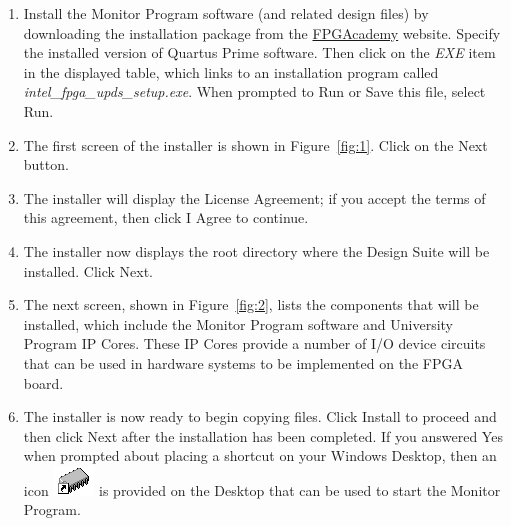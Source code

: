 \documentclass[11pt, twoside, pdftex]{article}
\begin{document}
\begin{enumerate}

\item Install the Monitor Program software (and related design files) by downloading the 
installation package from the 
\href{https://www.fpgacademy.org/tools.html}{FPGAcademy} website.
Specify the installed version of Quartus Prime software.
Then click on the {\it EXE} item in the displayed table, 
which links to an installation program called 
{\it intel\_fpga\_upds\_setup.exe}. When prompted to 
{\sf Run} or {\sf Save} this file, select {\sf Run}.
		  
\item The first screen of the installer is shown in Figure~\ref{fig:1}.
Click on the {\sf Next} button.

 \item The installer will display the License Agreement; if you accept the terms of this agreement, then click {\sf I Agree} to
continue.
	
\item The installer now displays the root directory where the
{\teamname} Design Suite will be installed.  
Click {\sf Next}.

\item The next screen, shown in Figure~\ref{fig:2}, lists the components that will be installed, which include the Monitor Program
software and University Program IP Cores. These IP Cores provide
a number of I/O device circuits that can be used in hardware
systems to be implemented on the FPGA board.

\item The installer is now ready to begin copying files. 
Click {\sf Install} to proceed and then click {\sf Next} after
the installation has been completed. 
If you answered {\sf Yes} when prompted about placing a shortcut on your Windows Desktop, then an icon 
\hbox{\includegraphics[scale=0.65]{images/img_shortcut_sm.png}}
is provided on the Desktop that can be used to start the Monitor
Program.


\end{enumerate}
\end{document}
